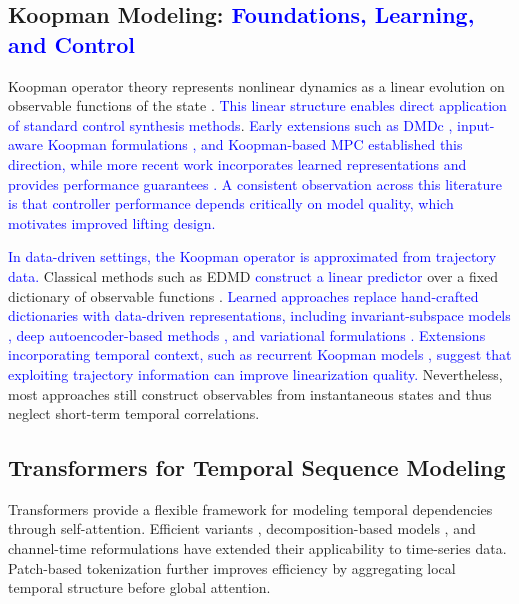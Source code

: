\documentclass[journal]{IEEEtran}
\begin{document}
\subsection{Koopman Modeling: \textcolor{blue}{Foundations, Learning, and Control}}

Koopman operator theory represents nonlinear dynamics as a linear evolution on observable functions of the state \cite{koopman1931hamiltonian, koopman1932spectra, mezic2005spectral, rowley2009spectral}. \textcolor{blue}{This linear structure enables direct application of standard control synthesis methods}. \textcolor{blue}{Early extensions such as DMDc \cite{proctor2016dmdc}, input-aware Koopman formulations \cite{proctor2018generalizing, brunton2016invariant}, and Koopman-based MPC \cite{korda2018linear} established this direction, while more recent work incorporates learned representations and provides performance guarantees \cite{han2020deep, shi2022deep, strasser2026overview, duran2025control}.}\textcolor{blue}{ A consistent observation across this literature is that controller performance depends critically on model quality, which motivates improved lifting design.}

\textcolor{blue}{In data-driven settings, the Koopman operator is approximated from trajectory data.} Classical methods such as EDMD \textcolor{blue}{construct a linear predictor} over a fixed dictionary of observable functions \cite{williams2015data, williams2015kernel, klus2018data}.\textcolor{blue}{ Learned approaches replace hand-crafted dictionaries with data-driven representations, including invariant-subspace models \cite{takeishi2017koopman}, deep autoencoder-based methods \cite{lusch2018deep, yeung2019learning}, and variational formulations \cite{morton2019deep, yuan2022variational}.} \textcolor{blue}{Extensions incorporating temporal context, such as recurrent Koopman models \cite{otto2019linearly, rank2019recurrent}, suggest that exploiting trajectory information can improve linearization quality.} Nevertheless, most approaches still construct observables from instantaneous states and thus neglect short-term temporal correlations.

\subsection{Transformers for Temporal Sequence Modeling}

Transformers \cite{vaswani2017attention} provide a flexible framework for modeling temporal dependencies through self-attention. Efficient variants \cite{zhou2021informer, wang2020linformer, katharopoulos2020transformers, choromanski2021performer}, decomposition-based models \cite{wu2021autoformer, zhou2022fedformer}, and channel-time reformulations \cite{zeng2023transformers, liu2024itransformer} have extended their applicability to time-series data. Patch-based tokenization \cite{nie2023time} further improves efficiency by aggregating local temporal structure before global attention.
\end{document}
